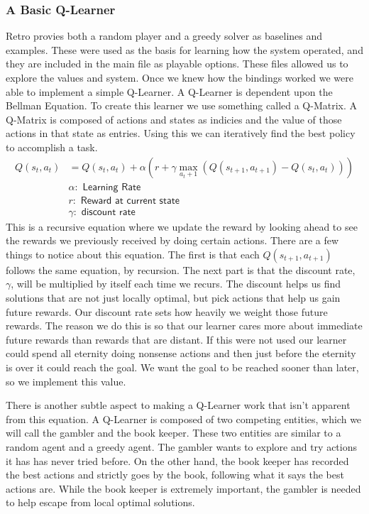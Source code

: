 \subsubsection{A Basic Q-Learner}
Retro provies both a random player and a greedy solver as baselines and examples.
These were used as the basis for learning how the system operated, and they are
included in the main file as playable options. These files allowed us to explore
the values and system. Once we knew how the bindings worked we were able to 
implement a simple Q-Learner. A Q-Learner is dependent upon the Bellman Equation.
To create this learner we use something called a Q-Matrix. A Q-Matrix is composed
of actions and states as indicies and the value of those actions in that state
as entries. Using this we can iteratively find the best policy to accomplish
a task.
\begin{align*}
    Q(s_t,a_t) &= Q(s_t,a_t) + \alpha(r + \gamma \max_{a_t+1}(Q(s_{t+1},a_{t+1}) - Q(s_t,a_t)))\\
    & \alpha: \textsf{ Learning Rate}\\
    & r: \textsf{ Reward at current state}\\
    & \gamma: \textsf{ discount rate}
\end{align*}
This is a recursive equation where we update the reward by looking ahead to see
the rewards we previously received by doing certain actions. There are a few
things to notice about this equation. The first is that each $Q(s_{t+1},a_{t+1})$ 
follows the same equation, by recursion. The next part is that the discount rate,
$\gamma$, will be multiplied by itself each time we recurs. The discount helps
us find solutions that are not just locally optimal, but pick actions that 
help us gain future rewards. Our discount rate sets how heavily we weight those 
future rewards. The reason we do this is so that our learner cares more about
immediate future rewards than rewards that are distant. If this were not used
our learner could spend all eternity doing nonsense actions and then just before
the eternity is over it could reach the goal. We want the goal to be reached
sooner than later, so we implement this value. 

There is another subtle aspect to making a Q-Learner work that isn't apparent
from this equation. A Q-Learner is composed of two competing entities, which
we will call the gambler and the book keeper. These two entities are similar
to a random agent and a greedy agent. The gambler wants to explore and try 
actions it has has never tried before. On the other hand, the book keeper has
recorded the best actions and strictly goes by the book, following what it 
says the best actions are. While the book keeper is extremely important, the 
gambler is needed to help escape from local optimal solutions. 

